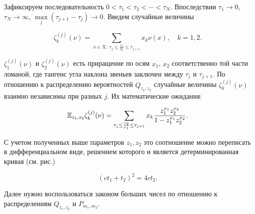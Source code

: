 \begin{ordre}
\begin{comment}
\[\begin{array}{l} {\Exp_{z_{1} ,z_{2} } \left(\sum _{x\in X}\nu (x)x_{1}  \right)=m_{1} ,} \\ {\Exp_{z_{1} ,z_{2} } \left(\sum _{x\in X}\nu (x)x_{2}  \right)=m_{2} .} \end{array}\] 

В результате алгебраических преобразований получаем, что при $m_{2} =cm_{1} $ значения $z_{1} ,z_{2} $ равны соответственно 

\[1-\left(\frac{\zeta (3)c}{\zeta (2)m_{1} } \right)^{\frac{1}{3}} (1+o(1)), \; \; 1-\left(\frac{\zeta (3)}{\zeta (2)c^{2} m_{1} } \right)^{\frac{1}{3}}  (1+o(1)).\] 

Дзета-функция Римана появляется в связи с тем, что рассматриваются только пары взаимно простых чисел -- пространство $X$ (см. задачу \ref{sec:z_func_riman} из раздела \ref{hard}).
\end{comment}

Зафиксируем последовательность $0<\tau _{1} <\tau _{2} <\cdots <\tau _{N} $. Впоследствии $\tau _{1} \to 0$, $\tau _{N} \to \infty $, $\mathop{\max }\limits_{j} (\tau _{j+1} -\tau _{j} )\to 0$. Введем случайные величины

\[\zeta _{k}^{(j)} (\nu )=\sum _{x\in X:\; \tau _{j} \le {\frac{x_2}{x_1}} \le \tau _{j+1} }x_{k} \nu (x) ,\quad k=1,2.\] 

\noindent $\zeta _{1}^{(j)} (\nu )$ и $\zeta _{2}^{(j)} (\nu )$ есть приращение по осям $x_{1} $, $x_{2} $ соответственно той части ломаной, где тангенс угла наклона звеньев заключен между $\tau _{j} $ и $\tau _{j+1} $. По отношению к распределению вероятностей $Q_{z_{1} ,z_{2} } $ случайные величины $\zeta _{k}^{(j)} (\nu )$ взаимно независимы при разных $j$. Их математические ожидания:

\[\mathrm{{\mathbb E}}_{z_{1} ,z_{2} } \zeta _{k}^{(j)} (\nu )=\sum _{\tau _{j} \le {\frac{x_2}{x_1}} \le \tau _{j+1} }x_{k} \frac{z_{1}^{x_{1} } z_{2}^{x_{2} } }{1-z_{1}^{x_{1} } z_{2}^{x_{2} } }  .\] 

С учетом полученных выше параметров $z_{1} ,z_{2} $ это соотношение можно переписать в дифференциальном виде, решением которого и является детерминированная кривая (см. рис.)

\[\left(ct_{1} +t_{2} \right)^{2} =4ct_{2} .\] 

Далее нужно воспользоваться законом больших чисел по отношению к распределениям $Q_{z_{1} ,z_{2} } $ и $P_{m_{1} ,m_{2} } $.

\end{ordre}
